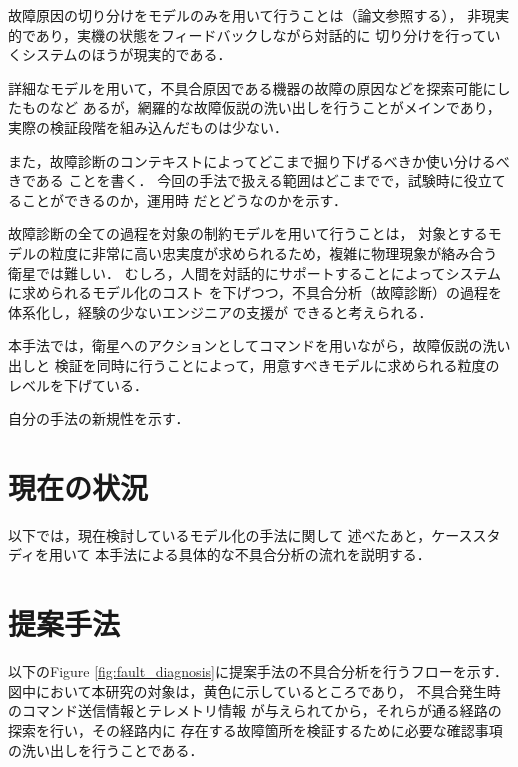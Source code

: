 \documentclass[11pt]{article}
\begin{document}
故障原因の切り分けをモデルのみを用いて行うことは（論文参照する），
非現実的であり，実機の状態をフィードバックしながら対話的に
切り分けを行っていくシステムのほうが現実的である．

詳細なモデルを用いて，不具合原因である機器の故障の原因などを探索可能にしたものなど
あるが，網羅的な故障仮説の洗い出しを行うことがメインであり，
実際の検証段階を組み込んだものは少ない．

また，故障診断のコンテキストによってどこまで掘り下げるべきか使い分けるべきである
\cite{Ontology1998}ことを書く．
今回の手法で扱える範囲はどこまでで，試験時に役立てることができるのか，運用時
だとどうなのかを示す．

故障診断の全ての過程を対象の制約モデルを用いて行うことは，
対象とするモデルの粒度に非常に高い忠実度が求められるため，複雑に物理現象が絡み合う
衛星では難しい．
むしろ，人間を対話的にサポートすることによってシステムに求められるモデル化のコスト
を下げつつ，不具合分析（故障診断）の過程を体系化し，経験の少ないエンジニアの支援が
できると考えられる．


本手法では，衛星へのアクションとしてコマンドを用いながら，故障仮説の洗い出しと
検証を同時に行うことによって，用意すべきモデルに求められる粒度のレベルを下げている．

自分の手法の新規性を示す．

%

\section{現在の状況}
以下では，現在検討しているモデル化の手法に関して
述べたあと，ケーススタディを用いて
本手法による具体的な不具合分析の流れを説明する．

\section{提案手法}
以下のFigure \ref{fig:fault_diagnosis}に提案手法の不具合分析を行うフローを示す．
図中において本研究の対象は，黄色に示しているところであり，
不具合発生時のコマンド送信情報とテレメトリ情報
が与えられてから，それらが通る経路の探索を行い，その経路内に
存在する故障箇所を検証するために必要な確認事項の洗い出しを行うことである．
\end{document}
